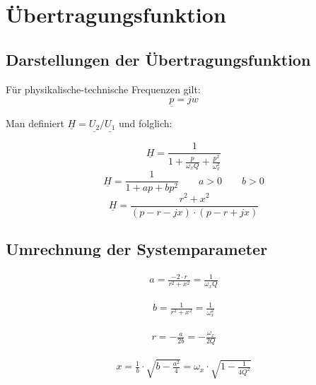 \documentclass[a4paper, 12pt]{report}
\begin{document}
\clearpage


\section*{Übertragungsfunktion}
	
\subsection*{Darstellungen der Übertragungsfunktion}
	Für physikalische-technische Frequenzen gilt:
	\[ \underline{p} = jw \]
	
	Man definiert $ \underline{H} = \underline{U_2} / \underline{U_1} $ und folglich:
	
	\[ \underline{H} = \frac{1}{1 + \frac{p}{\omega_x Q} + \frac{p^2}{\omega^2_x}} \]
	\[ \underline{H} = \frac{1}{1 + ap + bp^2} \qquad a > 0 \qquad b > 0 \]
	\[ \underline{H} = \frac{r^2 + x^2}{(p-r-jx) \cdot (p - r + jx)} \]
	
	
\subsection*{Umrechnung der Systemparameter}

	\vspace{-0.8cm}
	\begin{minipage}[t]{0.5\textwidth}
		\begin{align*}
			a = \frac{-2 \cdot r}{r^2 + x^2} = \frac{1}{\omega_x Q}
		\end{align*}
	\end{minipage}
	\begin{minipage}[t]{0.5\textwidth}
		\begin{align*}
			b = \frac{1}{r^2 + x^2} = \frac{1}{\omega^2_x}
		\end{align*}
	\end{minipage}
	
	\begin{minipage}[t]{0.5\textwidth}
		\vspace{0.2cm}
		\begin{align*}
			r = - \frac{a}{2b} = - \frac{\omega_x}{2Q}
		\end{align*}
	\end{minipage}
	\begin{minipage}[t]{0.5\textwidth}
		\begin{align*}
			x = \frac{1}{b} \cdot \sqrt{b - \frac{a^2}{4}} = \omega_x \cdot \sqrt{1 - \frac{1}{4Q^2}}
		\end{align*} 
	\end{minipage}
	
\end{document}
